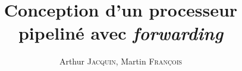 \documentclass{hibiscus}
\title{Conception d'un processeur pipeliné avec \textit{forwarding}}
\author{Arthur \textsc{Jacquin}, Martin \textsc{François}}
\begin{document}
\coverpage                      %
\foreword                       %
\tableofcontents









\bibliographyreferenceslist     %



\appendix

\end{document}
